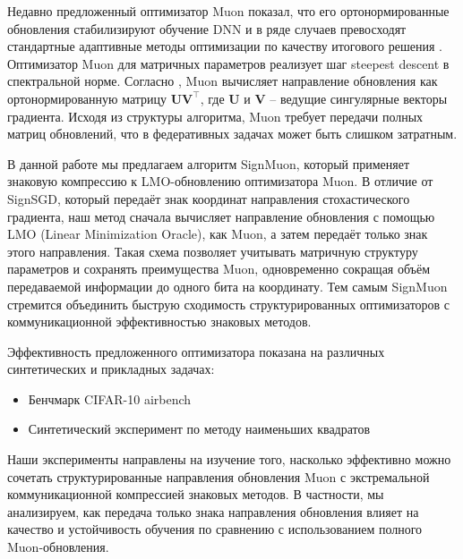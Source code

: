 \documentclass{article}
\begin{document}
Недавно предложенный оптимизатор Muon показал, что его ортонормированные обновления стабилизируют обучение DNN и в ряде случаев превосходят стандартные адаптивные методы оптимизации по качеству итогового решения \cite{jordan2024muon, bernstein2024old, shah2025practical}. Оптимизатор Muon для матричных параметров реализует шаг steepest descent в спектральной норме. Согласно \citet{jordan2024muon}, Muon вычисляет направление обновления как ортонормированную матрицу $\mathbf{U}\mathbf{V}^\top$, где $\mathbf{U}$ и $\mathbf{V}$ -- ведущие сингулярные векторы градиента. Исходя из структуры алгоритма, Muon требует передачи полных матриц обновлений, что в федеративных задачах может быть слишком затратным.  

В данной работе мы предлагаем алгоритм SignMuon, который применяет знаковую компрессию к LMO-обновлению оптимизатора Muon. В отличие от SignSGD, который передаёт знак координат направления стохастического градиента, наш метод сначала вычисляет направление обновления с помощью LMO (Linear Minimization Oracle), как Muon, а затем передаёт только знак этого направления. Такая схема позволяет учитывать матричную структуру параметров и сохранять преимущества Muon, одновременно сокращая объём передаваемой информации до одного бита на координату. Тем самым SignMuon стремится объединить быструю сходимость структурированных оптимизаторов с коммуникационной эффективностью знаковых методов.

Эффективность предложенного оптимизатора показана на различных синтетических и прикладных задачах: 
\begin{itemize}
    \item Бенчмарк CIFAR-10 airbench \cite{jordan2023cifar10}
    \item Синтетический эксперимент по методу наименьших квадратов
\end{itemize}
Наши эксперименты направлены на изучение того, насколько эффективно можно сочетать структурированные направления обновления Muon с экстремальной коммуникационной компрессией знаковых методов. В частности, мы анализируем, как передача только знака направления обновления влияет на качество и устойчивость обучения по сравнению с использованием полного Muon-обновления.
\end{document}
